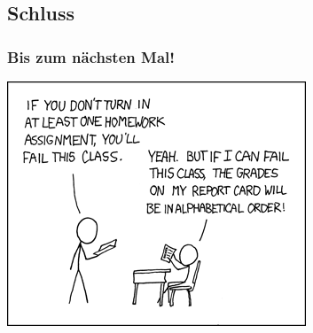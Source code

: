 \subsection{Schluss}
\begin{frame}
\frametitle{Bis zum nächsten Mal!}
\begin{center}
	\includegraphics[height=0.85\textheight]{images/xkcd_336}
\end{center}
\end{frame}

